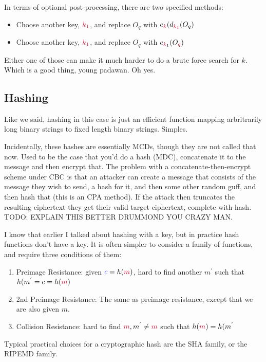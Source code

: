     In terms of optional post-processing, there are two specified methods:
    \begin{itemize}
        \item Choose another key, $\csubk{1}$, and replace $O_{q}$ with $e_{\ck}(d_{\csubk{1}}(O_{q})$
        \item Choose another key, $\csubk{1}$, and replace $O_{q}$ with $e_{\ck_{1}}(O_{\cq})$ 
    \end{itemize}

    Either one of those can make it much harder to do a brute force search for $k$. Which is a good thing, young padawan. Oh yes.

    \subsection{Hashing}
    Like we said, hashing in this case is just an efficient function mapping arbritrarily long binary strings to fixed length binary strings. Simples.

    Incidentally, these hashes are essentially MCDs, though they are not called that now. Used to be the case that you'd do a hash (MDC), concatenate it to the message and then encrypt that. The problem with a concatenate-then-encrypt scheme under CBC is that an attacker can create a message that consists of the message they wish to send, a hash for it, and then some other random guff, and then hash that (this is an CPA method). If the attack then truncates the resulting ciphertext they get their valid target ciphertext, complete with hash. TODO: EXPLAIN THIS BETTER DRUMMOND YOU CRAZY MAN.

    I know that earlier I talked about hashing with a key, but in practice hash functions don't have a key. It is often simpler to consider a family of functions, and require three conditions of them:
    \begin{enumerate}
        \item Preimage Resistance: given $\cc = h(\cm)$, hard to find another $m^{'}$ such that $h(m^{'} = c = h(\cm)$
        \item 2nd Preimage Resistance: The same as preimage resistance, except that we are also given $m$.
        \item Collision Resistance: hard to find $\cm, m^{'} \neq \cm$ such that $h(\cm) = h(m^{'}$
    \end{enumerate}

    Typical practical choices for a cryptographic hash are the SHA family, or the RIPEMD family.

